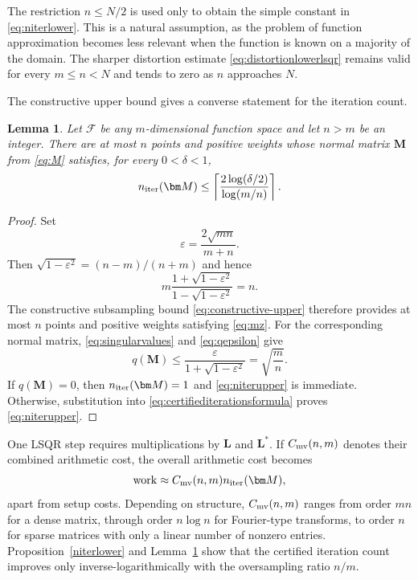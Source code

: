 \documentclass[a4paper]{amsart}
\numberwithin{equation}{section}
\newtheorem{lemma}[theorem]{Lemma}
\begin{document}
The restriction $n\le N/2$ is used only to obtain the simple constant in \eqref{eq:niterlower}.
This is a natural assumption, as the problem of function approximation becomes less relevant when the function is known on a majority of the domain.
The sharper distortion estimate \eqref{eq:distortionlowerlsqr} remains valid for every $m\le n<N$ and tends to zero as $n$ approaches $N$.

The constructive upper bound gives a converse statement for the iteration count.

\begin{lemma}\label{iterationupper}
    Let $\mathcal F$ be any $m$-dimensional function space and let $n>m$ be an integer.
    There are at most $n$ points and positive weights whose normal matrix $\bm M$ from \eqref{eq:M} satisfies, for every $0<\delta<1$,
    \begin{equation}\label{eq:niterupper}
        n_{\rm iter}(\bm M)
        \le
        \left\lceil
        \frac{2\log(\delta/2)}{\log(m/n)}
        \right\rceil.
    \end{equation}
\end{lemma}

\begin{proof}
    Set
    \begin{equation*}
        \varepsilon=\frac{2\sqrt{mn}}{m+n}.
    \end{equation*}
    Then $\sqrt{1-\varepsilon^2}=(n-m)/(n+m)$ and hence
    \begin{equation*}
        m\frac{1+\sqrt{1-\varepsilon^2}}
        {1-\sqrt{1-\varepsilon^2}}
        =n.
    \end{equation*}
    The constructive subsampling bound \eqref{eq:constructive-upper} therefore provides at most $n$ points and positive weights satisfying \eqref{eq:mz}.
    For the corresponding normal matrix, \eqref{eq:singularvalues} and \eqref{eq:qepsilon} give
    \begin{equation*}
        q(\bm M)
        \le\frac{\varepsilon}{1+\sqrt{1-\varepsilon^2}}
        =\sqrt{\frac mn}.
    \end{equation*}
    If $q(\bm M)=0$, then $n_{\rm iter}(\bm M)=1$ and \eqref{eq:niterupper} is immediate. Otherwise, substitution into \eqref{eq:certifiediterationsformula} proves \eqref{eq:niterupper}.
\end{proof}

One LSQR step requires multiplications by $\bm L$ and $\bm L^\ast$.
If $C_{\rm mv}(n,m)$ denotes their combined arithmetic cost, the overall arithmetic cost becomes
\begin{equation*}
    \operatorname{work}
    \approx C_{\rm mv}(n,m) n_{\rm iter}(\bm M),
\end{equation*}
apart from setup costs.
Depending on structure, $C_{\rm mv}(n,m)$ ranges from order $mn$ for a dense matrix, through order $n\log n$ for Fourier-type transforms, to order $n$ for sparse matrices with only a linear number of nonzero entries.
Proposition~\ref{niterlower} and Lemma~\ref{iterationupper} show that the certified iteration count improves only inverse-logarithmically with the oversampling ratio $n/m$.
\end{document}
